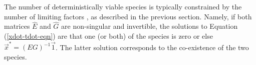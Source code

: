 %
%
The number of deterministically viable species is typically constrained by the number of limiting factors \cite{Armstrong1980}, as described in the previous section. 
Namely, if both matrices $\hat{E}$ and $ \hat{G}$ are non-singular and invertible, the solutions to Equation (\ref{xdot-tdot-eqn}) are that one (or both) of the species is zero or else $\vec{x}^* = (E G)^{-1}\vec{1}$. 
The latter solution corresponds to the co-existence of the two species.


